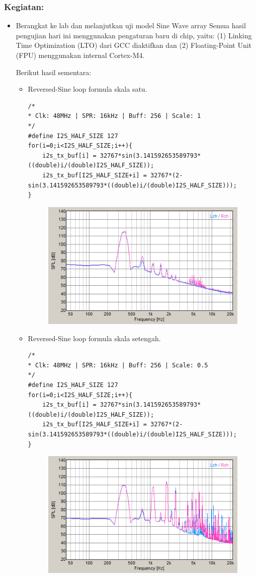 \documentclass[12pt,]{article}
\begin{document}
	\subsubsection{Kegiatan:}
	\begin{itemize}
		\item Berangkat ke lab dan melanjutkan uji model Sine Wave array
		Semua hasil pengujian hari ini menggunakan pengaturan baru di chip, yaitu:
		(1) Linking Time Optimization (LTO) dari GCC diaktifkan dan
		(2) Floating-Point Unit (FPU) menggunakan internal Cortex-M4.
		
		Berikut hasil sementara:
		\begin{itemize}
			\item Reversed-Sine loop formula skala satu.
			\begin{verbatim}
/*
* Clk: 48MHz | SPR: 16kHz | Buff: 256 | Scale: 1
*/
#define I2S_HALF_SIZE 127	
for(i=0;i<I2S_HALF_SIZE;i++){
	i2s_tx_buf[i] = 32767*sin(3.141592653589793*((double)i/(double)I2S_HALF_SIZE));
	i2s_tx_buf[I2S_HALF_SIZE+i] = 32767*(2-sin(3.141592653589793*((double)i/(double)I2S_HALF_SIZE)));
}
			\end{verbatim}
			\begin{figure}[H]
				\centering
				\includegraphics[width=0.5\linewidth]{result/tone1}
			\end{figure}
		
			\item Reversed-Sine loop formula skala setengah.
			\begin{verbatim}
/*
* Clk: 48MHz | SPR: 16kHz | Buff: 256 | Scale: 0.5
*/
#define I2S_HALF_SIZE 127	
for(i=0;i<I2S_HALF_SIZE;i++){
	i2s_tx_buf[i] = 32767*sin(3.141592653589793*((double)i/(double)I2S_HALF_SIZE));
	i2s_tx_buf[I2S_HALF_SIZE+i] = 32767*(2-sin(3.141592653589793*((double)i/(double)I2S_HALF_SIZE)));
}
			\end{verbatim}
			\begin{figure}[H]
				\centering
				\includegraphics[width=0.5\linewidth]{result/tone05}
			\end{figure}
		

\end{itemize}
\end{itemize}
\end{document}
